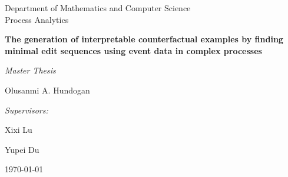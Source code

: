 \documentclass[./../paper.tex]{subfiles}
\begin{document}
\begin{titlepage}
    \centering
    Department of Mathematics and Computer Science\\
    Process Analytics 

    \vspace{3cm}
    {\LARGE\textbf{The generation of interpretable counterfactual examples by finding minimal edit sequences using event data in complex processes}}\par\vspace{0.5cm}
    {\large\textit{Master Thesis}}\par\vspace{1cm}
    {\large Olusanmi A. Hundogan}\par

    \vfill

    \emph{Supervisors:}\par
    Xixi Lu\par
    Yupei Du\par

    \today
    \vspace{2cm}


\end{titlepage}
\end{document}
